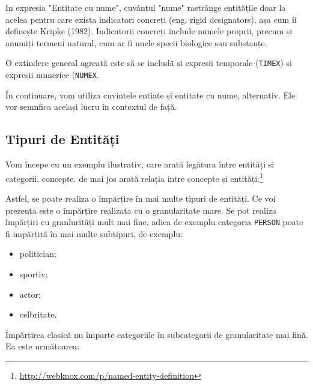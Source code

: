 In expresia "Entitate cu nume", cuvântul "nume" rastrânge entitățile doar la acelea pentru care exista indicatori concreți (eng. rigid designators), așa cum îi definește Kripke (1982). Indicatorii concreți include numele proprii, precum și anumiți termeni natural, cum ar fi unele specii biologice sau substanțe.

O extindere general agreată este să se includă și expresii temporale (\texttt{TIMEX}) si expresii numerice (\texttt{NUMEX}.

În continuare, vom utiliza cuvintele entiate și entitate cu nume, alternativ. Ele vor semnfica același lucru în contextul de față.

\subsection{Tipuri de Entități}

Vom începe cu un exemplu ilustrativ, care arată legătura între entități si categorii, concepte.  de mai jos arată relația intre concepte și entități.\footnote{\url{http://webknox.com/p/named-entity-definition}}



Astfel, se poate realiza o împărțire în mai multe tipuri de entități. Ce voi prezenta este o împărțire realizata cu o granularitate mare. Se pot realiza împărțiri cu granlurități mult mai fine, adica de exemplu categoria \texttt{PERSON} poate fi impărțită în mai multe subtipuri, de exemplu:

\begin{itemize}
\item politician;
\item sportiv;
\item actor;
\item celbritate.
\end{itemize}


Împărțirea clasică nu împarte categoriile în subcategorii de granularitate mai fină. Ea este următoarea:


